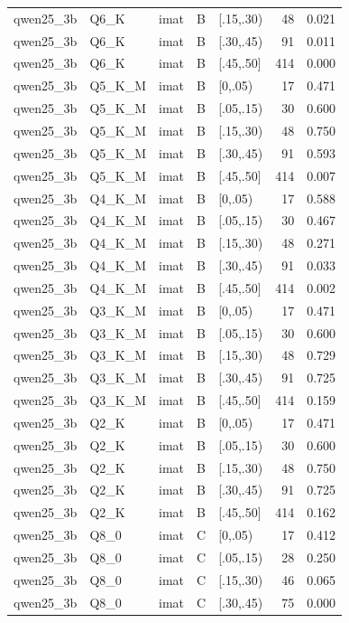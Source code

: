 \begin{tabular}{lllllrr}
qwen25\_3b & Q6\_K & imat & B & [.15,.30) & 48 & 0.021 \\
qwen25\_3b & Q6\_K & imat & B & [.30,.45) & 91 & 0.011 \\
qwen25\_3b & Q6\_K & imat & B & [.45,.50] & 414 & 0.000 \\
qwen25\_3b & Q5\_K\_M & imat & B & [0,.05) & 17 & 0.471 \\
qwen25\_3b & Q5\_K\_M & imat & B & [.05,.15) & 30 & 0.600 \\
qwen25\_3b & Q5\_K\_M & imat & B & [.15,.30) & 48 & 0.750 \\
qwen25\_3b & Q5\_K\_M & imat & B & [.30,.45) & 91 & 0.593 \\
qwen25\_3b & Q5\_K\_M & imat & B & [.45,.50] & 414 & 0.007 \\
qwen25\_3b & Q4\_K\_M & imat & B & [0,.05) & 17 & 0.588 \\
qwen25\_3b & Q4\_K\_M & imat & B & [.05,.15) & 30 & 0.467 \\
qwen25\_3b & Q4\_K\_M & imat & B & [.15,.30) & 48 & 0.271 \\
qwen25\_3b & Q4\_K\_M & imat & B & [.30,.45) & 91 & 0.033 \\
qwen25\_3b & Q4\_K\_M & imat & B & [.45,.50] & 414 & 0.002 \\
qwen25\_3b & Q3\_K\_M & imat & B & [0,.05) & 17 & 0.471 \\
qwen25\_3b & Q3\_K\_M & imat & B & [.05,.15) & 30 & 0.600 \\
qwen25\_3b & Q3\_K\_M & imat & B & [.15,.30) & 48 & 0.729 \\
qwen25\_3b & Q3\_K\_M & imat & B & [.30,.45) & 91 & 0.725 \\
qwen25\_3b & Q3\_K\_M & imat & B & [.45,.50] & 414 & 0.159 \\
qwen25\_3b & Q2\_K & imat & B & [0,.05) & 17 & 0.471 \\
qwen25\_3b & Q2\_K & imat & B & [.05,.15) & 30 & 0.600 \\
qwen25\_3b & Q2\_K & imat & B & [.15,.30) & 48 & 0.750 \\
qwen25\_3b & Q2\_K & imat & B & [.30,.45) & 91 & 0.725 \\
qwen25\_3b & Q2\_K & imat & B & [.45,.50] & 414 & 0.162 \\
qwen25\_3b & Q8\_0 & imat & C & [0,.05) & 17 & 0.412 \\
qwen25\_3b & Q8\_0 & imat & C & [.05,.15) & 28 & 0.250 \\
qwen25\_3b & Q8\_0 & imat & C & [.15,.30) & 46 & 0.065 \\
qwen25\_3b & Q8\_0 & imat & C & [.30,.45) & 75 & 0.000 \\

\end{tabular}

